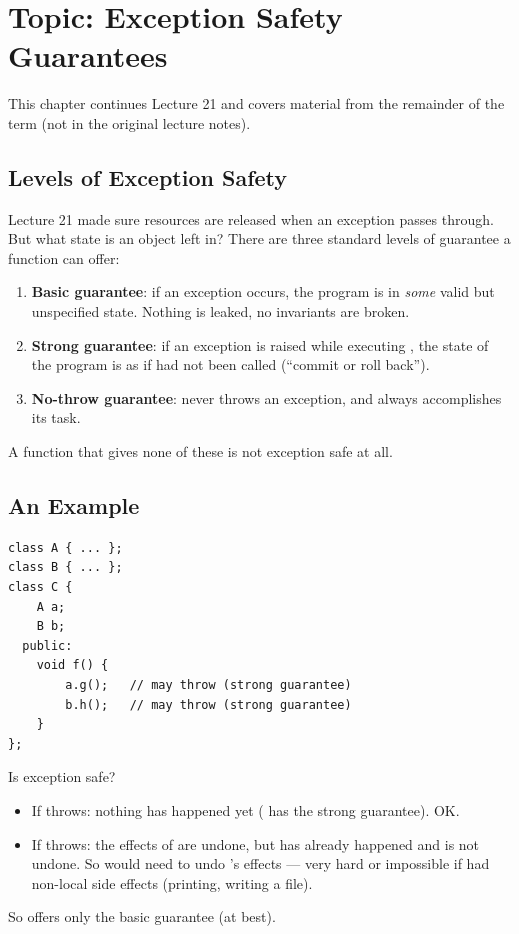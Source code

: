 \chapter{Topic: Exception Safety Guarantees}

\begin{aside}
This chapter continues Lecture 21 and covers material from the remainder of the
term (not in the original lecture notes).
\end{aside}

\section{Levels of Exception Safety}
Lecture 21 made sure resources are released when an exception passes through. But
what state is an object left in? There are three standard levels of guarantee a
function can offer:

\begin{definition}
\begin{enumerate}
  \item \textbf{Basic guarantee}: if an exception occurs, the program is in
        \emph{some} valid but unspecified state. Nothing is leaked, no
        invariants are broken.
  \item \textbf{Strong guarantee}: if an exception is raised while executing
        , the state of the program is as if  had not been
        called (``commit or roll back'').
  \item \textbf{No-throw guarantee}:  never throws an exception, and
        always accomplishes its task.
\end{enumerate}
\end{definition}
A function that gives none of these is not exception safe at all.

\section{An Example}
\begin{lstlisting}[style=cpp]
class A { ... };
class B { ... };
class C {
    A a;
    B b;
  public:
    void f() {
        a.g();   // may throw (strong guarantee)
        b.h();   // may throw (strong guarantee)
    }
};
\end{lstlisting}
Is  exception safe?
\begin{itemize}
  \item If  throws: nothing has happened yet ( has the
        strong guarantee). OK.
  \item If  throws: the effects of  are undone, but
         has already happened and is not undone. So  would
        need to undo 's effects --- very hard or impossible if 
        had non-local side effects (printing, writing a file).
\end{itemize}
So  offers only the basic guarantee (at best).


